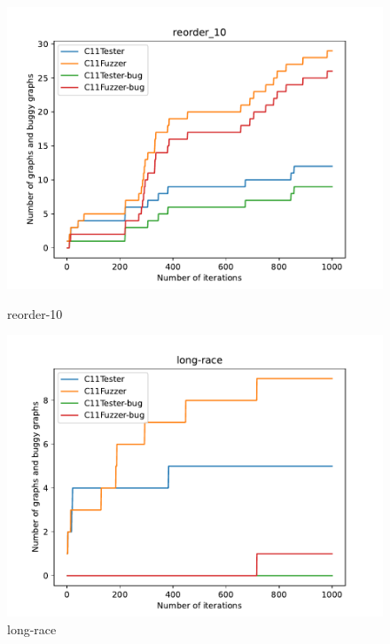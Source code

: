 \begin{figure}[H]

	\centering
	\begin{minipage}{0.45\textwidth}
		\centering
		\includegraphics[width=\textwidth]{figure/hardbug/reorder_10_bug.pdf}
		\caption{reorder-10}
		\label{hard:reorder-10}
	\end{minipage}
	\hfill
	\begin{minipage}{0.45\textwidth}
		\centering
		\includegraphics[width=\textwidth]{figure/hardbug/long-race_bug.pdf}
		\caption{long-race}
		\label{hardbug:long-race}
	\end{minipage}


\end{figure}
